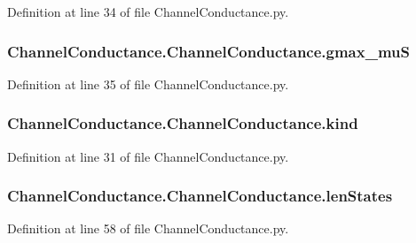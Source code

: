Definition at line 34 of file Channel\-Conductance.\-py.

\hypertarget{class_channel_conductance_1_1_channel_conductance_a80a0238a90b30b411c9381f682d0aeec}{
\subsubsection[{gmax\-\_\-mu\-S}]{\setlength{\rightskip}{0pt plus 5cm}Channel\-Conductance.\-Channel\-Conductance.\-gmax\-\_\-mu\-S}}\label{class_channel_conductance_1_1_channel_conductance_a80a0238a90b30b411c9381f682d0aeec}


Definition at line 35 of file Channel\-Conductance.\-py.

\hypertarget{class_channel_conductance_1_1_channel_conductance_a7bf3e28aab2160014358cde589f2ec39}{
\subsubsection[{kind}]{\setlength{\rightskip}{0pt plus 5cm}Channel\-Conductance.\-Channel\-Conductance.\-kind}}\label{class_channel_conductance_1_1_channel_conductance_a7bf3e28aab2160014358cde589f2ec39}


Definition at line 31 of file Channel\-Conductance.\-py.

\hypertarget{class_channel_conductance_1_1_channel_conductance_ae217799d13e5d225af048b7ba503fde1}{
\subsubsection[{len\-States}]{\setlength{\rightskip}{0pt plus 5cm}Channel\-Conductance.\-Channel\-Conductance.\-len\-States}}\label{class_channel_conductance_1_1_channel_conductance_ae217799d13e5d225af048b7ba503fde1}


Definition at line 58 of file Channel\-Conductance.\-py.

